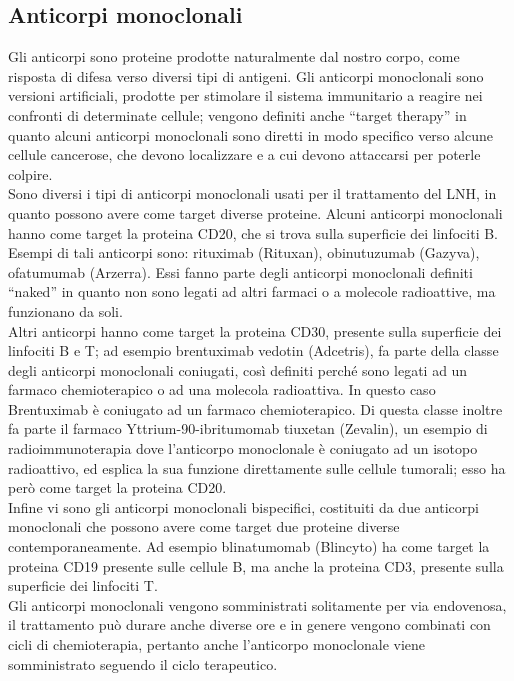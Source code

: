 \subsection{Anticorpi monoclonali}
Gli anticorpi sono proteine prodotte naturalmente dal nostro corpo, come risposta di difesa verso diversi tipi di 
antigeni. Gli anticorpi monoclonali sono versioni artificiali, prodotte per stimolare il sistema immunitario a reagire 
nei confronti di determinate cellule; vengono definiti anche “target therapy” in quanto alcuni anticorpi monoclonali 
sono diretti in modo specifico verso alcune cellule cancerose, che devono localizzare e a cui devono attaccarsi per 
poterle colpire\cite{IMMUNOTP}.\\
Sono diversi i tipi di anticorpi monoclonali usati per il trattamento del LNH, in quanto possono avere come target 
diverse proteine. 
Alcuni anticorpi monoclonali hanno come target la proteina CD20, che si trova sulla superficie dei linfociti B. 
Esempi di tali anticorpi sono: rituximab (Rituxan), obinutuzumab (Gazyva), ofatumumab (Arzerra). 
Essi fanno parte degli anticorpi monoclonali definiti “naked” in quanto non sono legati ad altri farmaci o a 
molecole radioattive, ma funzionano da soli\cite{LLSIMMUNO}.\\
Altri anticorpi hanno come target la proteina CD30, presente sulla superficie dei linfociti B e T; 
ad esempio brentuximab vedotin (Adcetris), fa parte della classe degli anticorpi monoclonali coniugati, 
così definiti perché sono legati ad un farmaco chemioterapico o ad una molecola radioattiva. In questo caso 
Brentuximab è coniugato ad un farmaco chemioterapico. Di questa classe inoltre fa parte il farmaco 
Yttrium-90-ibritumomab tiuxetan (Zevalin), un esempio di radioimmunoterapia dove l’anticorpo monoclonale è coniugato 
ad un isotopo radioattivo, ed esplica la sua funzione direttamente sulle cellule tumorali; esso ha però come target 
la proteina CD20\cite{LLSIMMUNO}.\\
Infine vi sono gli anticorpi monoclonali bispecifici, costituiti da due anticorpi monoclonali che possono avere come 
target due proteine diverse contemporaneamente. Ad esempio blinatumomab (Blincyto) ha come target la proteina CD19 
presente sulle cellule B, ma anche la proteina CD3, presente sulla superficie dei linfociti T\cite{LLSIMMUNO}.\\
Gli anticorpi monoclonali vengono somministrati solitamente per via endovenosa, il trattamento può durare anche 
diverse ore e in genere vengono combinati con cicli di chemioterapia, pertanto anche l’anticorpo monoclonale 
viene somministrato seguendo il ciclo terapeutico\cite{IMMUNOTP}.\\

